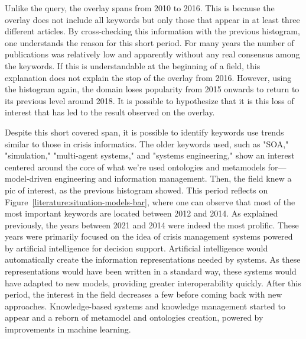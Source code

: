 Unlike the query, the overlay spans from 2010 to 2016.
This is because the overlay does not include all keywords but only those that appear in at least three different articles.
By cross-checking this information with the previous histogram, one understands the reason for this short period.
For many years the number of publications was relatively low and apparently without any real consensus among the keywords.
If this is understandable at the beginning of a field, this explanation does not explain the stop of the overlay from 2016.
However, using the histogram again, the domain loses popularity from 2015 onwards to return to its previous level around 2018.
It is possible to hypothesize that it is this loss of interest that has led to the result observed on the overlay.

Despite this short covered span, it is possible to identify keywords use trends similar to those in crisis informatics.
The older keywords used, such as "SOA," "simulation," "multi-agent systems," and "systems engineering," show an interest centered around the core of what we're used ontologies and metamodels for—model-driven engineering and information management.
Then, the field knew a pic of interest, as the previous histogram showed.
This period reflects on Figure~\ref{literature:situation-models-bar}, where one can observe that most of the most important keywords are located between 2012 and 2014.
As explained previously, the years between 2021 and 2014 were indeed the most prolific.
These years were primarily focused on the idea of crisis management systems powered by artificial intelligence for decision support.
Artificial intelligence would automatically create the information representations needed by systems.
As these representations would have been written in a standard way, these systems would have adapted to new models, providing greater interoperability quickly.
After this period, the interest in the field decreases a few before coming back with new approaches.
Knowledge-based systems and knowledge management started to appear and a reborn of metamodel and ontologies creation, powered by improvements in machine learning.

